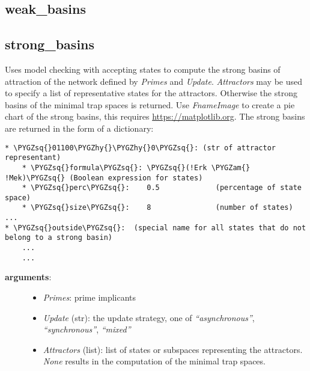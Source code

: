 \documentclass[letterpaper,10pt,english]{sphinxmanual}
\def\PYGZam{\char`\&}
\def\PYGZhy{\char`\-}
\def\PYGZsq{\char`\'}
\begin{document}
\subsection{weak\_basins}
\label{Basins:weak-basins}\label{Basins:id2}

\subsection{strong\_basins}
\label{Basins:strong-basins}\label{Basins:id3}

\begin{fulllineitems}
\label{Basins:PyBoolNet.Basins.strong_basins}
Uses model checking with accepting states to compute the strong basins of attraction of the network defined by \emph{Primes} and \emph{Update}.
\emph{Attractors} may be used to specify a list of representative states for the attractors.
Otherwise the strong basins of the minimal trap spaces is returned.
Use \emph{FnameImage} to create a pie chart of the strong basins, this requires \href{https://matplotlib.org}{https://matplotlib.org}.
The strong basins are returned in the form of a dictionary:

\begin{Verbatim}[commandchars=\\\{\}]
* \PYGZsq{}01100\PYGZhy{}\PYGZhy{}0\PYGZsq{}: (str of attractor representant)
    * \PYGZsq{}formula\PYGZsq{}: \PYGZsq{}(!Erk \PYGZam{} !Mek)\PYGZsq{} (Boolean expression for states)
    * \PYGZsq{}perc\PYGZsq{}:    0.5             (percentage of state space)
    * \PYGZsq{}size\PYGZsq{}:    8               (number of states)
...
* \PYGZsq{}outside\PYGZsq{}:  (special name for all states that do not belong to a strong basin)
    ...
    ...
\end{Verbatim}
\begin{description}
\item[{\textbf{arguments}:}] \leavevmode\begin{itemize}
\item {} 
\emph{Primes}: prime implicants

\item {} 
\emph{Update} (str): the update strategy, one of \emph{``asynchronous''}, \emph{``synchronous''}, \emph{``mixed''}

\item {} 
\emph{Attractors} (list): list of states or subspaces representing the attractors. \emph{None} results in the computation of the minimal trap spaces.


\end{itemize}
\end{description}
\end{fulllineitems}
\end{document}
